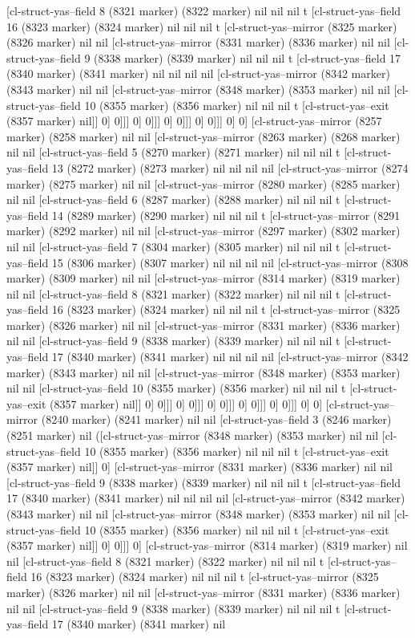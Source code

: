 {{[cl-struct-yas--field 8 (8321 marker) (8322 marker) nil nil nil t [cl-struct-yas--field 16 (8323 marker) (8324 marker) nil nil nil t [cl-struct-yas--mirror (8325 marker) (8326 marker) nil nil [cl-struct-yas--mirror (8331 marker) (8336 marker) nil nil [cl-struct-yas--field 9 (8338 marker) (8339 marker) nil nil nil t [cl-struct-yas--field 17 (8340 marker) (8341 marker) nil nil nil nil [cl-struct-yas--mirror (8342 marker) (8343 marker) nil nil [cl-struct-yas--mirror (8348 marker) (8353 marker) nil nil [cl-struct-yas--field 10 (8355 marker) (8356 marker) nil nil nil t [cl-struct-yas--exit (8357 marker) nil]] 0] 0]]] 0] 0]]] 0] 0]]] 0] 0]]] 0] 0] [cl-struct-yas--mirror (8257 marker) (8258 marker) nil nil [cl-struct-yas--mirror (8263 marker) (8268 marker) nil nil [cl-struct-yas--field 5 (8270 marker) (8271 marker) nil nil nil t [cl-struct-yas--field 13 (8272 marker) (8273 marker) nil nil nil nil [cl-struct-yas--mirror (8274 marker) (8275 marker) nil nil [cl-struct-yas--mirror (8280 marker) (8285 marker) nil nil [cl-struct-yas--field 6 (8287 marker) (8288 marker) nil nil nil t [cl-struct-yas--field 14 (8289 marker) (8290 marker) nil nil nil t [cl-struct-yas--mirror (8291 marker) (8292 marker) nil nil [cl-struct-yas--mirror (8297 marker) (8302 marker) nil nil [cl-struct-yas--field 7 (8304 marker) (8305 marker) nil nil nil t [cl-struct-yas--field 15 (8306 marker) (8307 marker) nil nil nil nil [cl-struct-yas--mirror (8308 marker) (8309 marker) nil nil [cl-struct-yas--mirror (8314 marker) (8319 marker) nil nil [cl-struct-yas--field 8 (8321 marker) (8322 marker) nil nil nil t [cl-struct-yas--field 16 (8323 marker) (8324 marker) nil nil nil t [cl-struct-yas--mirror (8325 marker) (8326 marker) nil nil [cl-struct-yas--mirror (8331 marker) (8336 marker) nil nil [cl-struct-yas--field 9 (8338 marker) (8339 marker) nil nil nil t [cl-struct-yas--field 17 (8340 marker) (8341 marker) nil nil nil nil [cl-struct-yas--mirror (8342 marker) (8343 marker) nil nil [cl-struct-yas--mirror (8348 marker) (8353 marker) nil nil [cl-struct-yas--field 10 (8355 marker) (8356 marker) nil nil nil t [cl-struct-yas--exit (8357 marker) nil]] 0] 0]]] 0] 0]]] 0] 0]]] 0] 0]]] 0] 0]]] 0] 0] [cl-struct-yas--mirror (8240 marker) (8241 marker) nil nil [cl-struct-yas--field 3 (8246 marker) (8251 marker) nil ([cl-struct-yas--mirror (8348 marker) (8353 marker) nil nil [cl-struct-yas--field 10 (8355 marker) (8356 marker) nil nil nil t [cl-struct-yas--exit (8357 marker) nil]] 0] [cl-struct-yas--mirror (8331 marker) (8336 marker) nil nil [cl-struct-yas--field 9 (8338 marker) (8339 marker) nil nil nil t [cl-struct-yas--field 17 (8340 marker) (8341 marker) nil nil nil nil [cl-struct-yas--mirror (8342 marker) (8343 marker) nil nil [cl-struct-yas--mirror (8348 marker) (8353 marker) nil nil [cl-struct-yas--field 10 (8355 marker) (8356 marker) nil nil nil t [cl-struct-yas--exit (8357 marker) nil]] 0] 0]]] 0] [cl-struct-yas--mirror (8314 marker) (8319 marker) nil nil [cl-struct-yas--field 8 (8321 marker) (8322 marker) nil nil nil t [cl-struct-yas--field 16 (8323 marker) (8324 marker) nil nil nil t [cl-struct-yas--mirror (8325 marker) (8326 marker) nil nil [cl-struct-yas--mirror (8331 marker) (8336 marker) nil nil [cl-struct-yas--field 9 (8338 marker) (8339 marker) nil nil nil t [cl-struct-yas--field 17 (8340 marker) (8341 marker) nil }}
